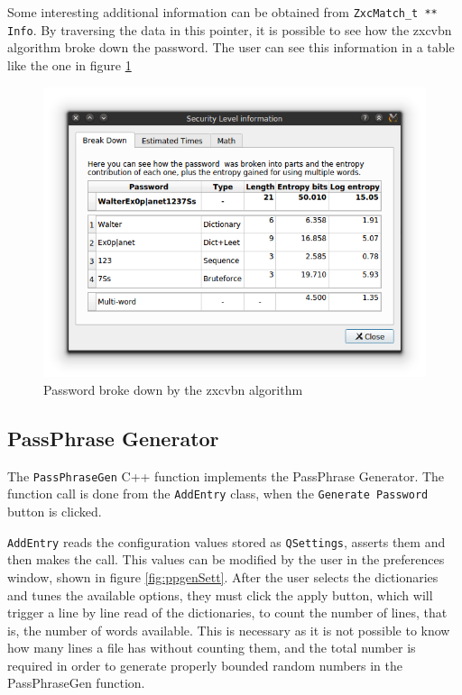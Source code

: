Some interesting additional information can be obtained from \texttt{ZxcMatch\_t ** Info}. By traversing the data in this pointer, it is possible to see how the zxcvbn algorithm broke down the password. The user can see this information in a table like the one in figure \ref{fig:zxcvbnBreak}
\begin{figure}[htb]    
  \centering
  \captionsetup{justification=centering}
  \includegraphics[width=0.9\columnwidth]{chapters/figures/development/zxcvbnBreak}
  \caption{Password broke down by the zxcvbn algorithm}
  \label{fig:zxcvbnBreak}
\end{figure}



\subsection{PassPhrase Generator} \label{sec:ppgen}

The \texttt{PassPhraseGen} C++ function implements the PassPhrase Generator. The function call is done from the \texttt{AddEntry} class, when the \texttt{Generate Password} button is clicked.

\texttt{AddEntry} reads the configuration values stored as \texttt{QSettings}, asserts them and then makes the call. This values can be modified by the user in the preferences window, shown in figure \ref{fig:ppgenSett}. After the user selects the dictionaries and tunes the available options, they must click the apply button, which will trigger a line by line read of the dictionaries, to count the number of lines, that is, the number of words available. This is necessary as it is not possible to know how many lines a file has without counting them, and the total number is required in order to generate properly bounded random numbers in the PassPhraseGen function.

